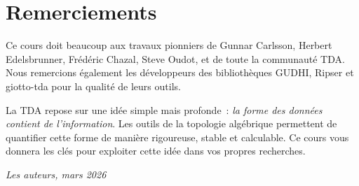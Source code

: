\section*{Remerciements}

Ce cours doit beaucoup aux travaux pionniers de Gunnar Carlsson, Herbert
Edelsbrunner, Fr\'ed\'eric Chazal, Steve Oudot, et de toute la communaut\'e
TDA. Nous remercions \'egalement les d\'eveloppeurs des biblioth\`eques
GUDHI, Ripser et giotto-tda pour la qualit\'e de leurs outils.

\begin{intuition}
La TDA repose sur une id\'ee simple mais profonde~: \emph{la forme des
donn\'ees contient de l'information}. Les outils de la topologie
alg\'ebrique permettent de quantifier cette forme de mani\`ere rigoureuse,
stable et calculable. Ce cours vous donnera les cl\'es pour exploiter
cette id\'ee dans vos propres recherches.
\end{intuition}

\bigskip
\hfill\textit{Les auteurs, mars 2026}
